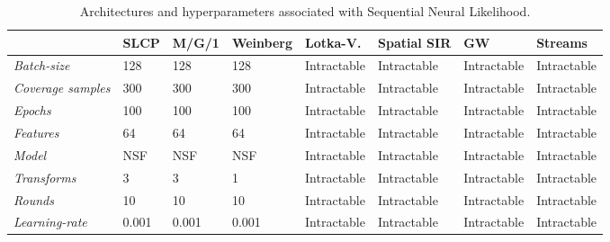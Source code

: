 \documentclass[twoside]{article}
\begin{document}
\begin{table}[h!]
    \centering
    \begin{tabular}{llllllll}
        \toprule
        & SLCP & M/G/1 & Weinberg & Lotka-V. & Spatial SIR & GW & Streams \\
        \midrule
        \emph{Batch-size} & 128 & 128 & 128 & Intractable & Intractable & Intractable & Intractable \\
        \emph{Coverage samples} & 300 & 300 & 300 & Intractable & Intractable & Intractable & Intractable \\
        \emph{Epochs} & 100 & 100 & 100 & Intractable & Intractable & Intractable & Intractable \\
        \emph{Features} & 64 & 64 & 64 & Intractable & Intractable & Intractable & Intractable \\
        \emph{Model} & NSF & NSF & NSF & Intractable & Intractable & Intractable & Intractable \\
        \emph{Transforms} & 3 & 3 & 1 & Intractable & Intractable & Intractable & Intractable \\
        \emph{Rounds} & 10 & 10 & 10 & Intractable & Intractable & Intractable & Intractable \\
        \emph{Learning-rate} & 0.001 & 0.001 & 0.001 & Intractable & Intractable & Intractable & Intractable \\
        \bottomrule
    \end{tabular}
    \caption{Architectures and hyperparameters associated with Sequential Neural Likelihood.}
    \label{tab:snl_hyperparameters}
\end{table}

\newpage
\end{document}
